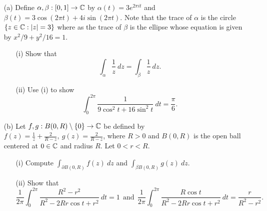 \documentclass[a4paper]{article}
\begin{document}
\begin{problem}
    \begin{enumerate}
    \item[(a)]    Define \( \alpha, \beta : [0,1] \to \mathbb{C}   \) by \( \alpha(t) = 3 e^{2 \pi i t } \) and \( \beta (t) = 3 \cos (2 \pi t) + 4 i \sin (2\pi t) \). Note that the trace of \( \alpha \) is the circle \( \{ z \in \mathbb{C} : | z  |  = 3  \}  \) where as the trace of \( \beta \) is the ellipse whose equation is given by \( x^{2}/9 + y^{2}/16 = 1  \).
        \begin{enumerate}
            \item[(i)] Show that 
                \[  \int_{ \alpha }^{  } \frac{ 1 }{ z }  \ dz = \int_{ \beta }^{  }  \frac{ 1 }{ z }   \ dz. \]
            \item[(ii)] Use (i) to show 
                \[  \int_{ 0 }^{ 2\pi }  \frac{ 1 }{ 9 \cos^{2} t + 16 \sin^{2} t }  \ dt = \frac{ \pi  }{ 6 }. \]
        \end{enumerate}
    \item[(b)] Let \( f,g : B(0,R) \setminus  \{ 0 \}  \to \mathbb{C}  \) be defined by \( f(z) = \frac{ 1 }{ z }  + \frac{ 2 }{ R-z }, \ g(z) = \frac{ 2 }{ R -z  }   \), where \( R > 0  \) and \( B(0,R) \) is the open ball centered at \( 0 \in \mathbb{C}  \) and radius \( R  \). Let \( 0 < r < R  \).
        \begin{enumerate}
            \item[(i)] Compute \( \displaystyle \int_{\partial B(0,R) }^{} f(z) \ dz   \) and \( \displaystyle \int_{\beta B (0,R) }^{} g(z) \ d z \).
            \item[(ii)] Show that 
                \[  \frac{ 1 }{ 2 \pi }  \int_{ 0 }^{ 2 \pi }  \frac{ R^{2} - r^{2}  }{  R^{2} - 2 Rr \cos t + r^{2} }  \ dt = 1 \ \ \text{and} \ \ \frac{ 1 }{ 2 \pi }  \int_{ 0 }^{ 2 \pi }  \frac{ R \cos t  }{  R^{2} - 2R r \cos t + r^{2} }  \ dt = \frac{ r  }{ R^{2} - r^{2} }. \]
        \end{enumerate}
    \end{enumerate}
\end{problem} 
\end{document}
